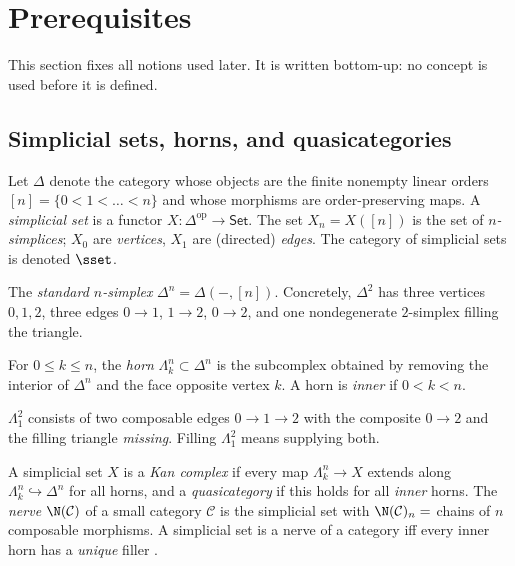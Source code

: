 \section{Prerequisites}
\label{sec:prerequisites}

This section fixes all notions used later. It is written bottom-up: no concept
is used before it is defined.

\subsection{Simplicial sets, horns, and quasicategories}

\begin{definition}
Let $\Delta$ denote the category whose objects are the finite nonempty linear
orders $[n] = \{0 < 1 < \dots < n\}$ and whose morphisms are order-preserving
maps. A \emph{simplicial set} is a functor $X : \Delta^{\mathrm{op}} \to
\mathsf{Set}$. The set $X_n = X([n])$ is the set of \emph{$n$-simplices};
$X_0$ are \emph{vertices}, $X_1$ are (directed) \emph{edges}. The category of
simplicial sets is denoted $\sset$.
\end{definition}

\begin{example}
The \emph{standard $n$-simplex} $\Delta^n = \Delta(-,[n])$. Concretely,
$\Delta^2$ has three vertices $0,1,2$, three edges $0\to1$, $1\to2$,
$0\to2$, and one nondegenerate $2$-simplex filling the triangle.
\end{example}

\begin{definition}[Horn]
For $0 \le k \le n$, the \emph{horn} $\Lambda^n_k \subset \Delta^n$ is the
subcomplex obtained by removing the interior of $\Delta^n$ and the face
opposite vertex $k$. A horn is \emph{inner} if $0 < k < n$.
\end{definition}

\begin{example}
$\Lambda^2_1$ consists of two composable edges $0 \to 1 \to 2$ with the
composite $0 \to 2$ and the filling triangle \emph{missing}. Filling
$\Lambda^2_1$ means supplying both.
\end{example}

\begin{definition}
A simplicial set $X$ is a \emph{Kan complex} if every map $\Lambda^n_k \to X$
extends along $\Lambda^n_k \hookrightarrow \Delta^n$ for all horns, and a
\emph{quasicategory} if this holds for all \emph{inner} horns. The
\emph{nerve} $\N(\mathcal{C})$ of a small category $\mathcal{C}$ is the
simplicial set with $\N(\mathcal{C})_n = $ chains of $n$ composable
morphisms. A simplicial set is a nerve of a category iff every inner horn has
a \emph{unique} filler \citep{lurie2009htt}.
\end{definition}

